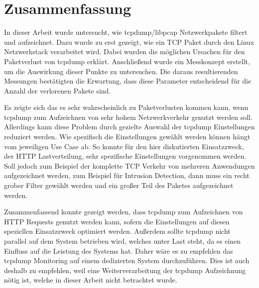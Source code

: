 \section{Zusammenfassung}
\label{sec:zusammenfassung}

In dieser Arbeit wurde untersucht, wie tcpdump/libpcap Netzwerkpakete filtert
und aufzeichnet. Dazu wurde zu erst gezeigt, wie ein TCP Paket durch den Linux
Netzwerkstack verarbeitet wird. Dabei wurden die möglichen Ursachen für den
Paketverlust von tcpdump erklärt. Anschließend wurde ein Messkonzept erstellt,
um die Auswirkung dieser Punkte zu untersuchen. Die daraus resultierenden
Messungen bestätigten die Erwartung, dass diese Parameter entscheidend für die
Anzahl der verlorenen Pakete sind.

Es zeigte sich das es sehr wahrscheinlich zu Paketverlusten kommen kann, wenn
tcpdump zum Aufzeichnen von sehr hohem Netzwerkverkehr genutzt werden soll.
Allerdings kann diese Problem durch gezielte Auswahl der tcpdump Einstellungen
reduziert werden. Wie spezifisch die Einstellungen gewählt werden können hängt
vom jeweiligen Use Case ab. So konnte für den hier diskutierten Einsatzzweck,
der HTTP Lastverteilung, sehr spezifische Einstellungen vorgenommen werden.
Soll jedoch zum Beispiel der komplette TCP Verkehr von mehreren Anwendungen
aufgezeichnet werden, zum Beispiel für Intrusion Detection, dann muss ein recht
grober Filter gewählt werden und ein großer Teil des Paketes aufgezeichnet
werden.

Zusammenfassend konnte gezeigt werden, dass tcpdump zum Aufzeichnen von HTTP
Requests genutzt werden kann, sofern die Einstellungen auf diesen speziellen
Einsatzzweck optimiert werden. Außerdem sollte tcpdump nicht parallel auf dem
System betrieben wird, welches unter Last steht, da es einen Einfluss auf die
Leistung des Systems hat. Daher wäre es zu empfehlen das tcpdump Monitoring auf
einem dedizierten System durchzuführen. Dies ist auch deshalb zu empfehlen,
weil eine Weiterverarbeitung der tcpdump Aufzeichnung nötig ist, welche in
dieser Arbeit nicht betrachtet wurde.

